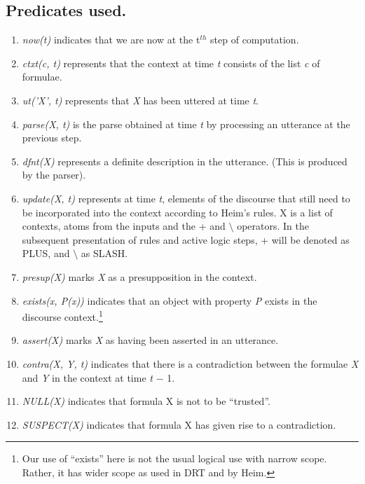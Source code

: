\documentclass{article}
\begin{document}
\subsection{Predicates used.}
\begin{enumerate}

\item
\emph{now(t)} indicates that we are now at the t$^{th}$ step of computation.

\item
\emph{ctxt(c, t)} represents that the context at time \emph{t}
consists of the list \emph{c} of formulae.

\item
\emph{ut('X', t)} represents that \emph{X} has been uttered at time \emph{t}.

\item
\emph{parse(X, t)} is the parse obtained at time \emph{t} by processing an
utterance at the previous step.

\item
\emph{dfnt(X)} represents a definite description in the utterance. (This is 
produced by the parser).

\item
\emph{update(X, t)} represents at time \emph{t}, elements of the discourse
that still need to be incorporated into the context according to Heim's
 rules. X is a list of contexts, atoms from the inputs and the + and 
$\setminus$ operators. In the subsequent presentation of rules and
active logic steps, + will be denoted as PLUS, and $\setminus$ as SLASH.

\item
\emph{presup(X)} marks \emph{X} as a presupposition in the context.

\item
\emph{exists(x, P(x))} indicates that an object with property \emph{P}
exists in the discourse context.\footnote{Our use of ``exists'' here
is not the usual logical use with narrow scope. Rather, it has wider
scope as used in DRT and by Heim.}

\item
\emph{assert(X)} marks \emph{X} as having been asserted in an
utterance.

\item
\emph{contra(X, Y, t)} indicates that there is a contradiction between the
formulae \emph{X} and \emph{Y} in the context at time \emph{t} $-$ 1.

\item
\emph{NULL(X)} indicates that formula X is not to be ``trusted''.

\item
\emph{SUSPECT(X)} indicates that formula X has given rise to a
contradiction.

\end{enumerate}
\end{document}
